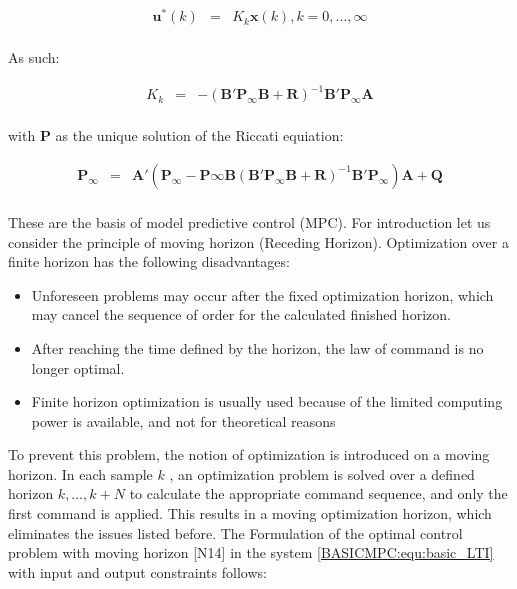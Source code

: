		\begin{equation}
        \begin{array}{rcl}
         \textbf{u}^*(k)&=&K_k\textbf{x}(k), k=0,\dots,\infty\\
        \end{array}
        \label{BASICMPC:equ:control_law_infinite}
    \end{equation}
		
		As such:
		
		\begin{equation}
        \begin{array}{rcl}
         K_k&=&-(\textbf{B}'\textbf{P}_\infty \textbf{B}+\textbf{R})^{-1}\textbf{B}'\textbf{P}_\infty \textbf{A}\\
        \end{array}
        \label{BASICMPC:equ:control_coefficient_infinite}
    \end{equation}
		
		with $\textbf{P}$ as the unique solution of the Riccati equiation:
		
		\begin{equation}
        \begin{array}{rcl}
				\textbf{P}_\infty&=&\textbf{A}'(\textbf{P}_\infty-\textbf{P}\infty \textbf{B}(\textbf{B}'\textbf{P}_\infty \textbf{B}+\textbf{R})^{-1}\textbf{B}'\textbf{P}_\infty)\textbf{A}+\textbf{Q}\\
        \end{array}
        \label{BASICMPC:equ:Riccati_infinite}
    \end{equation}
		
		These are the basis of model predictive control (MPC). For introduction let us consider the principle of moving horizon (Receding Horizon). Optimization over a finite horizon has the following disadvantages:
		
		\begin{itemize}
			\item Unforeseen problems may occur after the fixed optimization horizon, which may cancel the sequence of order for the 		calculated finished horizon.
		\item After reaching the time defined by the horizon, the law of command is no longer optimal.
		\item Finite horizon optimization is usually used because of the limited computing power is available, and not for theoretical reasons 
		\end{itemize}
		
		To prevent this problem, the notion of optimization is introduced on a moving horizon. In each sample $k$ , an optimization problem is solved over a defined horizon $k,\dots,k+N$ to calculate the appropriate command sequence, and only the first command is applied. This results in a moving optimization horizon, which eliminates the issues listed before. The Formulation of the optimal control problem with moving horizon [N14] in the system \ref{BASICMPC:equ:basic_LTI} with input and output constraints follows:
		
